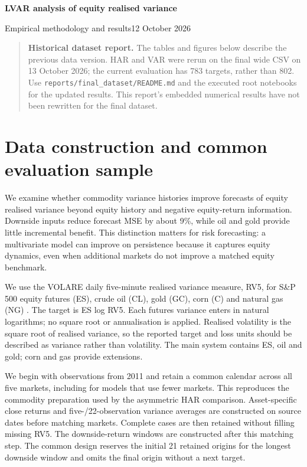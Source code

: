\documentclass[11pt,letterpaper]{article}
\begin{document}
{\Large\bfseries LVAR analysis of equity realised variance\par}
{\small Empirical methodology and results\hfill 12 October 2026\par}
\vspace{6pt}

\begin{quote}
\textbf{Historical dataset report.} The tables and figures below describe the
previous data version. HAR and VAR were rerun on the final wide CSV on
13 October 2026; the current evaluation has 783 targets, rather than 802.
Use \texttt{reports/final\_dataset/README.md} and the executed root notebooks
for the updated results. This report's embedded numerical results have not been
rewritten for the final dataset.
\end{quote}

\section*{Data construction and common evaluation sample}
We examine whether commodity variance histories improve forecasts of equity realised
variance beyond equity history and negative equity-return information. Downside inputs
reduce forecast MSE by about 9\%, while oil and gold provide little incremental
benefit. This distinction matters for risk forecasting: a multivariate model can
improve on persistence because it captures equity dynamics, even when additional
markets do not improve a matched equity benchmark.

We use the VOLARE daily five-minute realised variance measure, RV5, for S\&P 500
equity futures (ES), crude oil (CL), gold (GC), corn (C) and natural gas (NG)
\cite{volare}. The target is ES log RV5. Each futures variance enters in natural
logarithms; no square root or annualisation is applied. Realised volatility is the
square root of realised variance, so the reported target and loss units should be
described as variance rather than volatility. The main system contains ES, oil and
gold; corn and gas provide extensions.

We begin with observations from 2011 and retain a common calendar across all five
markets, including for models that use fewer markets. This reproduces the commodity
preparation used by the asymmetric HAR comparison. Asset-specific close returns and
five-/22-observation variance averages are constructed on source dates before
matching markets. Complete cases are then retained without filling missing RV5.
The downside-return windows are constructed after this matching step. The common
design reserves the initial 21 retained origins for the longest downside window
and omits the final origin without a next target.
\end{document}
